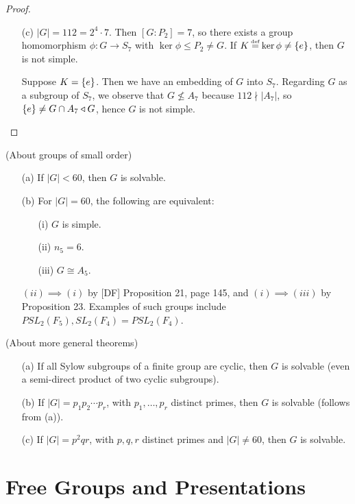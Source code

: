 \documentclass[11pt]{book}
\theoremstyle{definition}   \newtheorem{defn}[counter]{Definition} %
\newcommand\myeq{\mathrel{\overset{\makebox[0pt]{\mbox{\normalfont\tiny\sffamily \textrm{def}}}}{=}}}
\newcommand{\tl}{\triangleleft}   \newcommand{\sd}[1]{\rtimes_{#1}}   \newcommand{\x}{^{\times}}   \newcommand{\cyc}[1]{\begin{pmatrix} #1 \end{pmatrix}}
\DeclareMathOperator{\ra}{\rightarrow}   \DeclareMathOperator{\Poly}{\mathbf{P}}   \DeclareMathOperator{\spn}{\textnormal{span}}   \DeclareMathOperator{\aut}{\textnormal{Aut}}
\newcommand{\vs}{\vspace{8pt}}
\numberwithin{counter}{chapter}
\begin{document}
\begin{proof}
\begin{example}
\begin{enumerate}
\item[(c)] $|G| = 112 = 2^4 \cdot 7$. Then $[G : P_2] = 7$, so there exists a group homomorphism $\phi : G \ra S_7$ with $\ker \phi \leq P_2 \ne G$. If $K \myeq \ker \phi \ne \triv$, then $G$ is not simple.

Suppose $K = \{e\}$. Then we have an embedding of $G$ into $S_7$. Regarding $G$ as a subgroup of $S_7$, we observe that $G \nleq A_7$ because $112 \nmid |A_7|$, so $\triv \neq G \cap A_7 \tl G$, hence $G$ is not simple.
\end{enumerate}
\end{example}
\end{proof}

\vs

\begin{remark}(About groups of small order)
\
\begin{enumerate}
\item[(a)] If $|G| < 60$, then $G$ is solvable.
\item[(b)] For $|G| = 60$, the following are equivalent:
	\begin{enumerate}
	\item[(i)] $G$ is simple.
	\item[(ii)] $n_5 = 6$.
	\item[(iii)] $G \cong A_5$.
	\end{enumerate}
$(ii) \implies (i)$ by [DF] Proposition 21, page 145, and $(i) \implies (iii)$ by Proposition 23. Examples of such groups include $PSL_2(F_5), SL_2(F_4) = PSL_2(F_4)$.
\end{enumerate}
\end{remark}

\vs

\begin{remark}(About more general theorems)
\
\begin{enumerate}
\item[(a)] If all Sylow subgroups of a finite group are cyclic, then $G$ is solvable (even a semi-direct product of two cyclic subgroups).
\item[(b)] If $|G| = p_1 p_2 \cdots p_r$, with $p_1, \dots, p_r$ distinct primes, then $G$ is solvable (follows from (a)).
\item[(c)] If $|G| = p^2qr$, with $p,q,r$ distinct primes and $|G| \ne 60$, then $G$ is solvable.
\end{enumerate}
\end{remark}



\chapter{Free Groups and Presentations}
\end{document}
